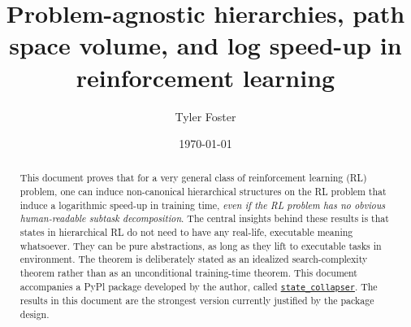\documentclass[11pt]{article}
\title{Problem-agnostic hierarchies, path space volume, and log speed-up in reinforcement learning}
\author{Tyler Foster}
\date{\today}
\begin{document}
\maketitle

\begin{abstract}
This document proves that for a very general class of reinforcement learning (RL) problem, one can induce non-canonical hierarchical structures on the RL problem that induce a logarithmic speed-up in training time, {\em even if the RL problem has no obvious human-readable subtask decomposition}. The central insights behind these results is that states in hierarchical RL do not need to have any real-life, executable meaning whatsoever. They can be pure abstractions, as long as they lift to executable tasks in environment. The theorem is deliberately stated as an idealized search-complexity theorem rather than as an unconditional training-time theorem. This document accompanies a PyPl package developed by the author, called \href{}{\texttt{state\_collapser}}. The results in this document are the strongest version currently justified by the package design.
\end{abstract}

\setcounter{tocdepth}{2}
\tableofcontents
\end{document}
